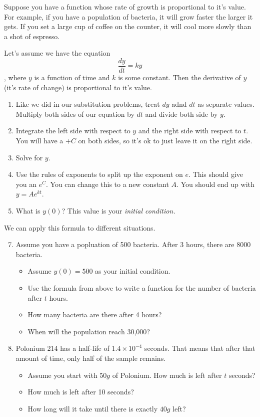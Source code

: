\documentclass{article}
\begin{document}
Suppose you have a function whose rate of growth is proportional to it's value. For example, if you have a population of bacteria, it will grow faster the larger it gets. If you set a large cup of coffee on the counter, it will cool more slowly than a shot of espresso.

Let's assume we have the equation
$$\frac{dy}{dt} = ky$$, where $y$ is a function of time and $k$ is some constant. Then the derivative of $y$ (it's rate of change) is proportional to it's value.

\begin{enumerate}
    \item Like we did in our substitution problems, treat $dy$ adnd $dt$ as separate values. Multiply both sides of our equation by $dt$ and divide both side by $y$.
    \item Integrate the left side with respect to $y$ and the right side with respect to $t$. You will have a $+C$ on both sides, so it's ok to just leave it on the right side.
    \item Solve for $y$.
    \item Use the rules of exponents to split up the exponent on $e$. This should give you an $e^C$. You can change this to a new constant $A$. You should end up with $y = Ae^{kt}$.
    \item What is $y(0)$? This value is your \textit{initial condition.}
\end{enumerate}

We can apply this formula to different situations.

\begin{enumerate}
    \setcounter{enumi}{6}
    \item Assume you have a popluation of 500 bacteria. After 3 hours, there are 8000 bacteria.
    \begin{itemize}
        \item Assume $y(0) = 500$ as your initial condition.
        \item Use the formula from above to write a function for the number of bacteria after $t$ hours.
        \item How many bacteria are there after 4 hours?
        \item When will the population reach 30,000?
    \end{itemize}
    \item Polonium 214 has a half-life of $1.4 \times 10^{-4}$ seconds. That means that after that amount of time, only half of the sample remains.
    \begin{itemize}
        \item Assume you start with $50g$ of Polonium. How much is left after $t$ seconds?
        \item How much is left after 10 seconds?
        \item How long will it take until there is exactly $40g$ left?
        \end{itemize}
\end{enumerate}
\end{document}
